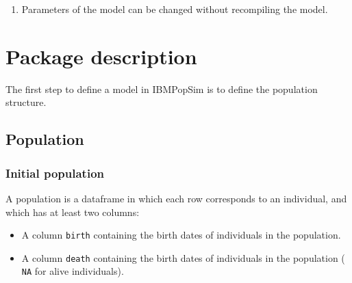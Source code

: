 \begin{enumerate}
\def\labelenumi{\arabic{enumi}.}
\setcounter{enumi}{7}
\tightlist
\item
  Parameters of the model can be changed without recompiling the model.
\end{enumerate}

\begin{Shaded}
\begin{Highlighting}[]
\OperatorTok{$}\StringTok{ }

\NormalTok{events\_bounds[}\NormalTok{]\textless{}{-}}\StringTok{ }\OperatorTok{$}\OperatorTok{*}\OperatorTok{$}\OperatorTok{*}

\StringTok{ }
                   \NormalTok{)}
\end{Highlighting}
\end{Shaded}

\hypertarget{package-description}{%
\section{Package description}\label{package-description}}

The first step to define a model in IBMPopSim is to define the population structure.

\hypertarget{population}{%
\subsection{Population}\label{population}}

\hypertarget{initial-population}{%
\subsubsection{Initial population}\label{initial-population}}

A population is a dataframe in which each row corresponds to an individual, and
which has at least two columns:

\begin{itemize}
\tightlist
\item
  A column \texttt{birth} containing the birth dates of individuals in the population.
\item
  A column \texttt{death} containing the birth dates of individuals in the population ( \texttt{NA} for alive individuals).
\end{itemize}

